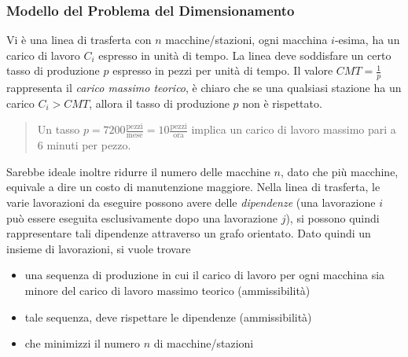 \documentclass[10pt, letterpaper]{report}
\begin{document}
\subsubsection{Modello del Problema del Dimensionamento}
Vi è una linea di trasferta con $n$ macchine/stazioni, ogni macchina $i$-esima, ha un carico di lavoro 
$C_i$ espresso in unità di tempo. La linea deve soddisfare un certo tasso di produzione $p$ espresso in 
pezzi per unità di tempo. Il valore $CMT=\frac{1}{p}$ rappresenta il \textit{carico massimo teorico}, è 
chiaro che se una qualsiasi stazione ha un carico $C_i>CMT$, allora il tasso di produzione $p$ non è 
rispettato.\begin{quote}
    Un tasso $p=7200\frac{\text{pezzi}}{\text{mese}}=10\frac{\text{pezzi}}{\text{ora}}$ implica un 
    carico di lavoro massimo pari a $6$ minuti per pezzo. 
\end{quote}
Sarebbe ideale inoltre ridurre il numero delle macchine $n$, dato che più macchine, equivale a dire un costo 
di manutenzione maggiore. Nella linea di trasferta, le varie lavorazioni da eseguire possono avere 
delle \textit{dipendenze} (una lavorazione $i$ può essere eseguita esclusivamente dopo una lavorazione 
$j$), si possono quindi rappresentare tali dipendenze attraverso un grafo orientato. \acc 
Dato quindi un insieme di lavorazioni, si vuole trovare \begin{itemize}
    \item una sequenza di produzione in cui il carico di lavoro per ogni macchina sia minore del carico di lavoro massimo teorico (ammissibilità)
    \item tale sequenza, deve rispettare le dipendenze (ammissibilità)
    \item che minimizzi il numero $n$ di macchine/stazioni
\end{itemize}
\end{document}
